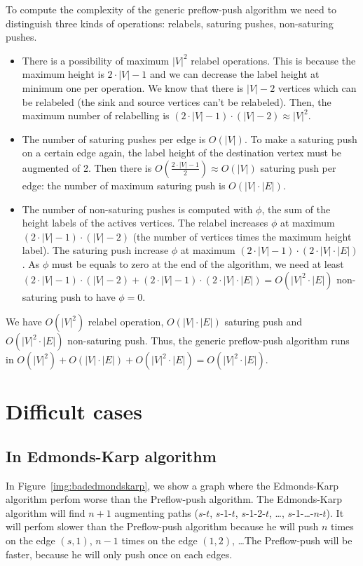 To compute the complexity of the generic preflow-push algorithm we need to distinguish three kinds of operations: relabels, saturing pushes, non-saturing pushes.
\begin{itemize}
\item There is a possibility of maximum $|V|^2$ relabel operations. This is because the maximum height is $2\cdot |V| - 1$ and we can decrease the label height at minimum one per operation. We know that there is $|V| - 2$ vertices which can be relabeled (the sink and source vertices can't be relabeled). Then, the maximum number of relabelling is $(2\cdot |V| - 1) \cdot (|V| - 2) \approx |V|^2$.

\item The number of saturing pushes per edge is $O(|V|)$. To make a saturing push on a certain edge again, the label height of the destination vertex must be augmented of 2. Then there is $O(\frac{2\cdot |V| - 1}{2}) \approx O(|V|)$ saturing push per edge: the number of maximum saturing push is $O(|V|\cdot |E|)$.

\item The number of non-saturing pushes is computed with $\phi$, the sum of the height labels of the actives vertices. The relabel increases $\phi$ at maximum $(2\cdot |V| - 1)\cdot (|V|-2)$ (the number of vertices times the maximum height label). The saturing push increase $\phi$ at maximum $(2\cdot |V|-1)\cdot (2\cdot |V|\cdot |E|)$. As $\phi$ must be equals to zero at the end of the algorithm, we need at least $(2\cdot |V|-1)\cdot (|V|-2) + (2\cdot |V|-1)\cdot (2\cdot |V|\cdot |E|) = O(|V|^2\cdot |E|)$ non-saturing push to have $\phi = 0$.
\end{itemize}
We have $O(|V|^2)$ relabel operation, $O(|V|\cdot |E|)$ saturing push and $O(|V|^2\cdot |E|)$ non-saturing push. Thus, the generic preflow-push algorithm runs in $O(|V|^2) + O(|V|\cdot |E|) + O(|V|^2\cdot |E|) = O(|V|^2 \cdot |E|)$. 

\section{Difficult cases}

\subsection{In Edmonds-Karp algorithm}

In Figure~\ref{img:badedmondskarp}, we show a graph where the Edmonds-Karp algorithm perfom worse than the Preflow-push algorithm.  The Edmonds-Karp algorithm will find $n+1$ augmenting paths ($s$-$t$, $s$-1-$t$, $s$-1-2-$t$, \dots, $s$-1-\dots-$n$-$t$). It will perfom slower than the Preflow-push algorithm because he will push $n$ times on the edge $(s, 1)$, $n-1$ times on the edge $(1, 2)$, \dots The Preflow-push will be faster, because he will only push once on each edges.

